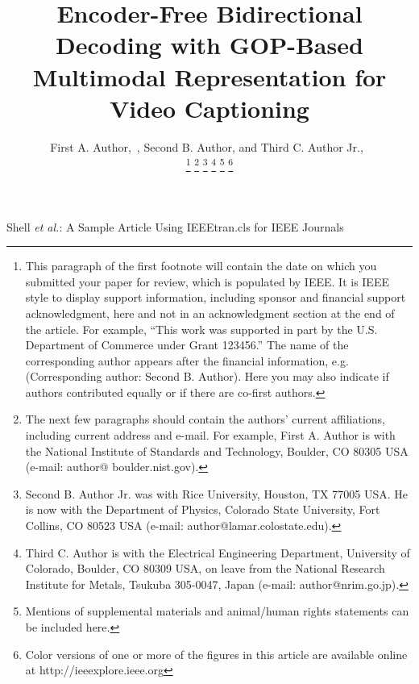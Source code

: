 \documentclass[lettersize,journal]{IEEEtran}
\begin{document}
\title{{\fontsize{24}{28}\selectfont Encoder-Free Bidirectional Decoding with GOP-Based Multimodal Representation for Video Captioning}}

\author{First A. Author,~, Second B. Author, and Third C. Author Jr.,~

\thanks{This paragraph of the first footnote will contain the date on which you submitted your paper for review, which is populated by IEEE. It is IEEE style to display support information, including sponsor and financial support acknowledgment, here and not in an acknowledgment section at the end of the article. For example, “This work was supported in part by the U.S. Department of Commerce under Grant 123456.” The name of the corresponding author appears after the financial information, e.g. (Corresponding author: Second B. Author). Here you may also indicate if authors contributed equally or if there are co-first authors.}%
\thanks{The next few paragraphs should contain the authors’ current affiliations, including current address and e-mail. For example, First A. Author is with the National Institute of Standards and Technology, Boulder, CO 80305 USA (e-mail: author@ boulder.nist.gov).}%
\thanks{Second B. Author Jr. was with Rice University, Houston, TX 77005 USA. He is now with the Department of Physics, Colorado State University, Fort Collins, CO 80523 USA (e-mail: author@lamar.colostate.edu).}%
\thanks{Third C. Author is with the Electrical Engineering Department, University of Colorado, Boulder, CO 80309 USA, on leave from the National Research Institute for Metals, Tsukuba 305-0047, Japan (e-mail: author@nrim.go.jp).}%
\thanks{Mentions of supplemental materials and animal/human rights statements can be included here.}%
\thanks{Color versions of one or more of the figures in this article are available online at http://ieeexplore.ieee.org}}

%
{Shell \MakeLowercase{\textit{et al.}}: A Sample Article Using IEEEtran.cls for IEEE Journals}

%
\end{document}
